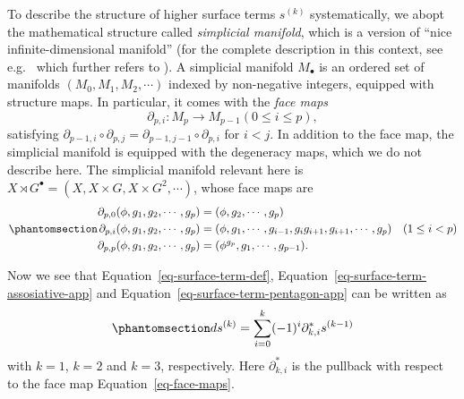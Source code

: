 \documentclass[11pt,toc=bibliography]{scrbook}
\numberwithin{equation}{section}
\begin{document}
To describe the structure of higher surface terms \(s^{(k)}\)
systematically, we abopt the mathematical structure called
\emph{simplicial manifold}, which is a version of ``nice
infinite-dimensional manifold'' (for the complete description in this
context, see e.g.~\autocite{kubel2018equivariant} which further refers
to \autocite{dupont1978curvature}). A simplicial manifold \(M_\bullet\)
is an ordered set of manifolds \((M_0,M_1,M_2,\cdots)\) indexed by
non-negative integers, equipped with structure maps. In particular, it
comes with the \emph{face maps} \[
\partial_{p,i} : M_p \to M_{p-1}  (0 \le i \le p ),
\] satisfying
\(\partial_{p-1,i} \circ \partial_{p,j} = \partial_{p-1,j-1} \circ \partial_{p,i}\)
for \(i<j\). In addition to the face map, the simplicial manifold is
equipped with the degeneracy maps, which we do not describe here. The
simplicial manifold relevant here is
\(X \rtimes G^\bullet = (X, X \times G, X \times G^2 , \cdots)\), whose
face maps are \begin{equation}\phantomsection\label{eq-face-maps}{
\begin{aligned}
\partial_{p,0} (\phi,g_1,g_2,\cdots,g_p) &= (\phi,g_2,\cdots,g_p)\\
\partial_{p,i} (\phi,g_1,g_2,\cdots,g_p) &= (\phi,g_1,\cdots,g_{i-1}, g_ig_{i+1}, g_{i+1},\cdots, g_p)\quad(1\le i < p)\\
\partial_{p,p} (\phi,g_1,g_2,\cdots,g_p) &= (\phi^{g_p},g_1,\cdots,g_{p-1}).
\end{aligned}
}\end{equation}

Now we see that Equation~\ref{eq-surface-term-def},
Equation~\ref{eq-surface-term-assosiative-app} and
Equation~\ref{eq-surface-term-pentagon-app} can be written as
\begin{equation}\phantomsection\label{eq-simplicial-closed-form}{
ds^{(k)} = \sum_{i=0}^{k} (-1)^{i} \partial_{k,i}^* s^{(k-1)}
}\end{equation} with \(k=1\), \(k=2\) and \(k=3\), respectively. Here
\(\partial_{k,i}^*\) is the pullback with respect to the face map
Equation~\ref{eq-face-maps}.
\end{document}
